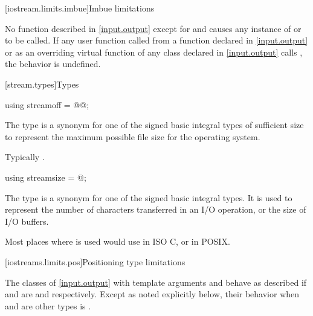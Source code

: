 [iostream.limits.imbue]{Imbue limitations}

\pnum
No function described in \ref{input.output} except for
and 
causes any instance of
or
to be called.
If any user function called from a function declared in \ref{input.output} or
as an overriding virtual function of any class declared in \ref{input.output}
calls
,
the behavior is undefined.

[stream.types]{Types}

%
\begin{itemdecl}
using streamoff = @@;
\end{itemdecl}

\begin{itemdescr}
\pnum
The type  is a synonym for one of the signed basic integral types of
sufficient size to represent the maximum possible file size for the operating system.
\begin{footnote}
Typically .
\end{footnote}
\end{itemdescr}

%
\begin{itemdecl}
using streamsize = @\impdef@;
\end{itemdecl}

\begin{itemdescr}
\pnum
The type
is a synonym for one of the signed basic
integral types.
It is used to represent the number of characters transferred in an I/O
operation, or the size of I/O buffers.
\begin{footnote}
Most places where  is used would use  in ISO C,
or  in POSIX.
\end{footnote}
\end{itemdescr}


[iostreams.limits.pos]{Positioning type limitations}

\pnum
The classes of \ref{input.output} with template arguments
and
behave as described if
and
are
and
respectively.
Except as noted explicitly below, their behavior when
and
are other types is
.

